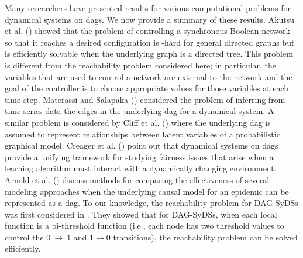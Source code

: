 Many researchers have presented results for various computational
problems for dynamical systems on dags.
We now provide a summary of these results.
Akutsu et al. (\citeyear{Akutsu-etal-2007}) showed that the problem
of controlling a synchronous Boolean network so that it
reaches a desired configuration is \cnp-hard for 
general directed graphs but is efficiently solvable 
when the underlying graph is a directed tree.
This problem is different from the reachability problem
considered here; in particular, the variables that are used to
control a network are external to the network and the goal of the controller
is to choose appropriate values for those variables at each time step.
Materassi and Salapaka (\citeyear{Materassi-etal-2013}) considered the
problem of inferring from time-series data the edges in 
the underlying dag for a dynamical system.
A similar problem is considered by 
Cliff et al. (\citeyear{Cliff-etal-2016}) where the underlying
dag is assumed to represent relationships between latent 
variables of a probabilistic graphical model.
Creager et al. (\citeyear{Creager-etal-2020}) point out that dynamical systems
on dags provide a unifying framework for studying fairness issues that
arise when a learning algorithm must interact with a dynamically
changing environment.
Arnold et al. (\citeyear{Arnold-etal-2019}) discuss methods
for comparing the effectiveness of several modeling approaches 
when the underlying causal model
for an epidemic can be represented as a dag.
To our knowledge, the reachability problem for DAG-SyDSs 
was first considered in \cite{KKM+2013}. 
They showed that for DAG-SyDSs, when each local function is 
a bi-threshold function (i.e., each node has two threshold
values to control the $0 ~\rightarrow~  1$ and $1 \rightarrow 0$
transitions), the reachability problem can be solved efficiently.

